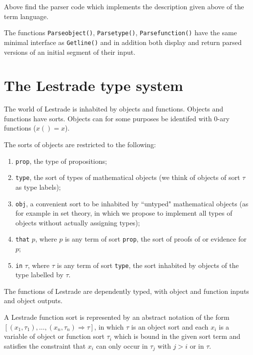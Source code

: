 \documentclass[12pt]{article}
\begin{document}
Above find the parser code which implements the description given above of the term language.

The functions {\tt Parseobject()}, {\tt Parsetype()}, {\tt Parsefunction()} have the same minimal interface as {\tt Getline()} and in addition both display and return parsed versions of an initial segment of their input.





\newpage



\section{The Lestrade type system}

The world of Lestrade is inhabited by objects and functions.  Objects and functions have sorts.  Objects can for some purposes be identifed with 0-ary functions ($x() = x$).

The sorts of objects are restricted to the following:

\begin{enumerate}

\item {\tt prop}, the type of propositions;

\item {\tt type}, the sort of types of mathematical objects (we think of objects of sort $\tau$  as type labels);

\item {\tt obj}, a convenient sort to be inhabited by ``untyped" mathematical objects (as for example in set theory, in which we propose to implement all types of objects without actually assigning types);

\item {\tt that} $p$, where $p$ is any term of sort {\tt prop}, the sort of proofs of or evidence for $p$;

\item {\tt in} $\tau$, where $\tau$ is any term of sort {\tt type}, the sort inhabited by objects of the type labelled by $\tau$.

\end{enumerate}

The functions of Lestrade are dependently typed, with object and function inputs and object outputs.

A Lestrade function sort is represented by an abstract notation of the form $[(x_1,\tau_1),\ldots,(x_n,\tau_n) \Rightarrow \tau]$, in which $\tau$ is an object sort and each $x_i$ is a variable of object or function sort $\tau_i$ which is bound in the given sort term and satisfies the constraint that $x_i$ can only occur in $\tau_j$ with $j>i$ or in $\tau$.
\end{document}

